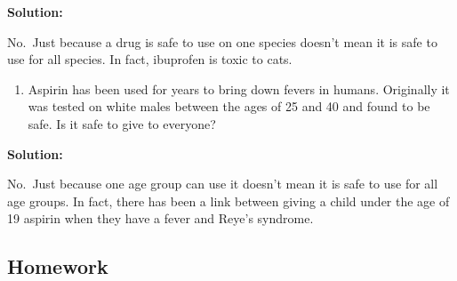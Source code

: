 \documentclass[]{book}
\providecommand{\tightlist}{%
  \setlength{\itemsep}{0pt}\setlength{\parskip}{0pt}}
\begin{document}
\textbf{Solution:}

No.~Just because a drug is safe to use on one species doesn't mean it is safe to use for all species. In fact, ibuprofen is toxic to cats.

\begin{enumerate}
\def\labelenumi{\alph{enumi}.}
\setcounter{enumi}{1}
\tightlist
\item
  Aspirin has been used for years to bring down fevers in humans. Originally it was tested on white males between the ages of 25 and 40 and found to be safe. Is it safe to give to everyone?
\end{enumerate}

\textbf{Solution:}

No.~Just because one age group can use it doesn't mean it is safe to use for all age groups. In fact, there has been a link between giving a child under the age of 19 aspirin when they have a fever and Reye's syndrome.

\hypertarget{homework-3}{%
\subsection{Homework}\label{homework-3}}
\end{document}
